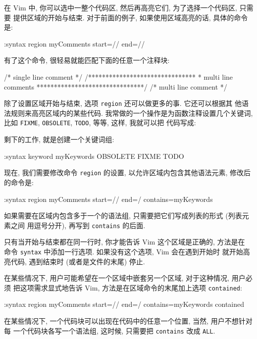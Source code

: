 在 Vim 中, 你可以选中一整个代码区, 然后再高亮它们, 为了选择一个代码区, 只需要
提供区域的开始与结束. 对于前面的例子, 如果使用区域高亮的话, 具体的命令是:
\begin{vimcode}
:syntax region myComments start=/\/\*/ end=/\*\//
\end{vimcode}
有了这个命令, 很轻易就能匹配下面的任意一个注释块:
\begin{vimcode}
/* single line comment */
/*******************************
 *  multi line comments
 *******************************/
/* multi line comment
 */
\end{vimcode}

除了设置区域开始与结束, 选项 \texttt{region} 还可以做更多的事. 它还可以根据其
他语法规则来高亮区域内的某些代码. 我常做的一个操作是为函数注释设置几个关键词,
比如 \texttt{FIXME}, \texttt{OBSOLETE}, \texttt{TODO}, 等等, 这样, 我就可以把
代码写成:
\begin{vimcode}
/*  function: splitString()
 *  args    : string
 *  OBSOLETE
 */
function splitString(string) {
...
\end{vimcode}
剩下的工作, 就是创建一个关键词组:
\begin{vimcode}
:syntax keyword myKeywords OBSOLETE FIXME TODO
\end{vimcode}
现在, 我们需要修改命令 \texttt{region} 的设置, 以允许区域内包含其他语法元素,
修改后的命令是:
\begin{vimcode}
:syntax region myComments start=/\/\*/ end=\/\*\// contains=myKeywords
\end{vimcode}

如果需要在区域内包含多于一个的语法组, 只需要把它们写成列表的形式 (列表元素之间
用逗号分开), 再写到 \texttt{contains} 的后面.

\begin{warning}
    只有当开始与结束都在同一行时, 你才能告诉 Vim 这个区域是正确的, 方法是在
    命令 \texttt{syntax} 中添加一行选项. 如果没有这个选项, Vim 会在遇到开始时
    就开始高亮代码, 遇到结束时 (或者是文件的末尾) 停止.
\end{warning}

在某些情况下, 用户可能希望在一个区域中嵌套另一个区域, 对于这种情况, 用户必须
把这项需求显式地告诉 Vim, 方法是在区域命令的末尾加上选项 \texttt{contained}:
\begin{vimcode}
:syntax region myComments start=/\/\*/ end=\/\*\// contains=myKeywords
contained
\end{vimcode}

在某些情况下, 一个代码块可以出现在代码中的任意一个位置, 当然, 用户不想针对每
一个代码块各写一个语法组, 这时候, 只需要把 \texttt{contains} 改成 \texttt{ALL}.

